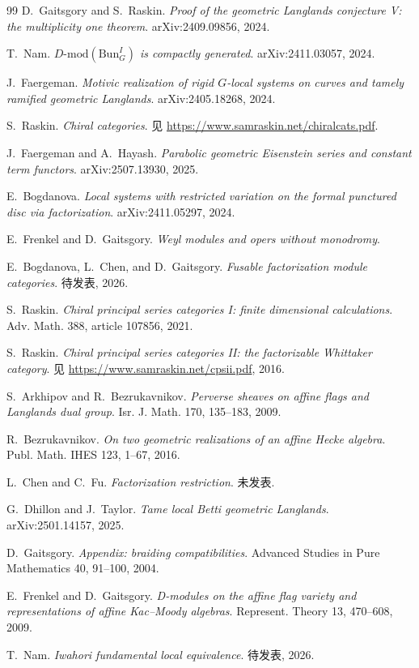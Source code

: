 \begin{thebibliography}{99}
 D.~Gaitsgory and S.~Raskin. \emph{Proof of the geometric Langlands
conjecture V: the multiplicity one theorem}. arXiv:2409.09856, 2024.

 T.~Nam. \emph{$D\text{-}\mathrm{mod}(\mathrm{Bun}^I_G)$ is compactly
generated}. arXiv:2411.03057, 2024.

 J.~Faergeman. \emph{Motivic realization of rigid $G$-local systems on
curves and tamely ramified geometric Langlands}. arXiv:2405.18268, 2024.

 S.~Raskin. \emph{Chiral categories}. 见
\url{https://www.samraskin.net/chiralcats.pdf}.

 J.~Faergeman and A.~Hayash. \emph{Parabolic geometric Eisenstein series
and constant term functors}. arXiv:2507.13930, 2025.

 E.~Bogdanova. \emph{Local systems with restricted variation on the formal
punctured disc via factorization}. arXiv:2411.05297, 2024.

 E.~Frenkel and D.~Gaitsgory. \emph{Weyl modules and opers without monodromy}.

 E.~Bogdanova, L.~Chen, and D.~Gaitsgory. \emph{Fusable factorization
module categories}. 待发表, 2026.

 S.~Raskin. \emph{Chiral principal series categories I: finite dimensional
calculations}. Adv. Math. 388, article 107856, 2021.

 S.~Raskin. \emph{Chiral principal series categories II: the factorizable
Whittaker category}. 见 \url{https://www.samraskin.net/cpsii.pdf}, 2016.

 S.~Arkhipov and R.~Bezrukavnikov. \emph{Perverse sheaves on affine flags
and Langlands dual group}. Isr. J. Math. 170, 135--183, 2009.

 R.~Bezrukavnikov. \emph{On two geometric realizations of an affine Hecke
algebra}. Publ. Math. IHES 123, 1--67, 2016.

 L.~Chen and C.~Fu. \emph{Factorization restriction}. 未发表.

 G.~Dhillon and J.~Taylor. \emph{Tame local Betti geometric Langlands}.
arXiv:2501.14157, 2025.

 D.~Gaitsgory. \emph{Appendix: braiding compatibilities}. Advanced Studies
in Pure Mathematics 40, 91--100, 2004.

 E.~Frenkel and D.~Gaitsgory. \emph{D-modules on the affine flag variety and
representations of affine Kac--Moody algebras}. Represent. Theory 13, 470--608, 2009.

 T.~Nam. \emph{Iwahori fundamental local equivalence}. 待发表, 2026.

\end{thebibliography}
